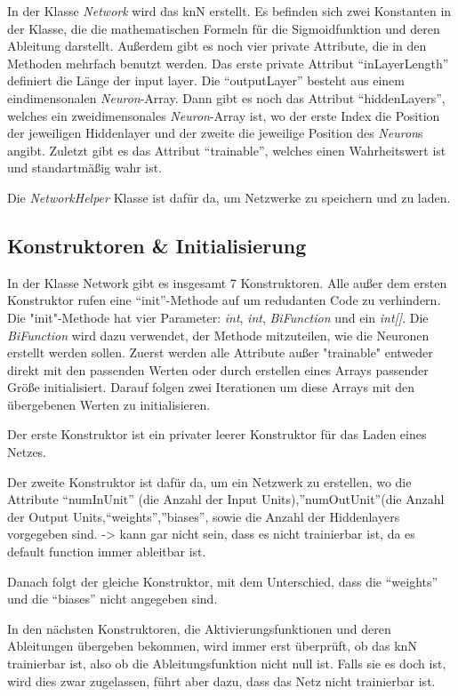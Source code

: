\documentclass[paper=A4,pagesize=auto,12pt,headinclude=true,footinclude=true,BCOR=0mm,DIV=calc]{scrartcl}
\begin{document}
In der Klasse \textit{Network} wird das knN erstellt.
Es befinden sich zwei Konstanten in der Klasse, die die mathematischen Formeln für die Sigmoidfunktion und deren Ableitung darstellt. Außerdem gibt es noch vier private Attribute,  die in den Methoden mehrfach benutzt werden. Das erste private Attribut “inLayerLength” definiert die Länge der input layer. Die “outputLayer” besteht aus einem eindimensonalen \textit{Neuron}-Array. Dann gibt es noch das Attribut “hiddenLayers”, welches ein zweidimensonales \textit{Neuron}-Array ist, wo der erste Index die Position der jeweiligen Hiddenlayer und der zweite die jeweilige Position des \textit{Neuron}s angibt. Zuletzt gibt es das Attribut “trainable”, welches einen Wahrheitswert ist und standartmäßig wahr ist.

Die \textit{NetworkHelper} Klasse ist dafür da, um Netzwerke zu speichern und zu laden.


\subsection{Konstruktoren \& Initialisierung} %
In der Klasse Network gibt es insgesamt 7 Konstruktoren.
Alle außer dem ersten Konstruktor rufen eine “init”-Methode auf um redudanten Code zu verhindern. Die "init"-Methode hat vier Parameter: \textit{int}, \textit{int}, \textit{BiFunction} und ein \textit{int[]}. Die \textit{BiFunction} wird dazu verwendet, der Methode mitzuteilen, wie die Neuronen erstellt werden sollen.
Zuerst werden alle Attribute außer "trainable" entweder direkt mit den passenden Werten oder durch erstellen eines Arrays passender Größe initialisiert.
Darauf folgen zwei Iterationen um diese Arrays mit den übergebenen Werten zu initialisieren.

Der erste Konstruktor ist ein privater leerer Konstruktor für das Laden eines Netzes. 

Der zweite Konstruktor ist dafür da, um ein Netzwerk zu erstellen, wo die Attribute “numInUnit” (die Anzahl der Input Units),”numOutUnit”(die Anzahl der Output Units,“weights”,”biases”, sowie die Anzahl der Hiddenlayers vorgegeben sind.
-> kann gar nicht sein, dass es nicht trainierbar ist, da es default function immer ableitbar ist.

Danach folgt der gleiche Konstruktor, mit dem Unterschied, dass die “weights” und die “biases” nicht angegeben sind.

In den nächsten Konstruktoren, die Aktivierungsfunktionen und deren Ableitungen übergeben bekommen, wird immer erst überprüft, ob das knN trainierbar ist, also ob die Ableitungsfunktion nicht null ist. Falls sie es doch ist, wird dies zwar zugelassen, führt aber dazu, dass das Netz nicht trainierbar ist. 
\end{document}
